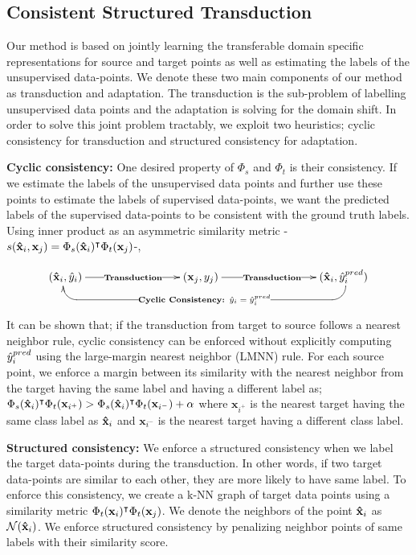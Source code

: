 \subsection{Consistent Structured Transduction}
Our method is based on jointly learning the transferable domain specific representations for source and target points as well as estimating the labels of the unsupervised data-points. We denote these two main components of our method as transduction and adaptation. The transduction is the sub-problem of labelling unsupervised data points and the adaptation is solving for the domain shift. In order to solve this joint problem tractably, we exploit two heuristics; cyclic consistency for transduction and structured consistency for adaptation. 

\textbf{Cyclic consistency:} One desired property of  $\Phi_s$ and $\Phi_t$ is their consistency. If we estimate the labels of the unsupervised data points and further use these points to estimate the labels of supervised data-points, we want the predicted labels of the supervised data-points to be consistent with the ground truth labels. Using inner product as an asymmetric similarity metric -$s(\mathbf{\hat{x}}_i, \mathbf{x}_j) = \Phi_s(\mathbf{\hat{x}}_i)^\intercal \Phi_t(\mathbf{x}_j)$-,

\begin{displaymath}
    \xymatrix{
        (\xsi,\ysi) \ar@{<-}@<-2pt>`d[r] `[rrrrrr]|{\textbf{Cyclic Consistency: $\ysi = \ysi^{pred}$}} [rrrrrr]  \ar[rrr]|{\textbf{Transduction}}     &&& (\xuj, \yuj) \ar[rrr]|{\textbf{Transduction}} &&&  (\xsi,\ysi^{pred}) }
\end{displaymath}

It can be shown that; if the transduction from target to source follows a nearest neighbor rule, cyclic consistency can be enforced without explicitly computing $\hat{y}_i^{pred}$ using the large-margin nearest neighbor (LMNN)\cite{lmnn} rule. For each source point, we enforce a margin between its similarity with the nearest neighbor from the target having the same label and having a different label as; $ \Phi_s(\mathbf{\hat{x}}_i)^\intercal \Phi_t(\mathbf{x}_{i^+}) > \Phi_s(\mathbf{\hat{x}}_i)^\intercal \Phi_t(\mathbf{x}_{i^-}) + \alpha$ where $\mathbf{x}_{i^+}$ is the nearest target having the same class label as $\mathbf{\hat{x}}_i$ and $\mathbf{x}_{i^-}$ is the nearest target having a different class label. 


\textbf{Structured consistency:} We enforce a structured consistency when we label the target data-points during the transduction. In other words, if two target data-points are similar to each other, they are more likely to have same label. To enforce this consistency, we create a k-NN graph of target data points using a similarity metric $\Phi_t(\mathbf{x}_i)^\intercal \Phi_t(\mathbf{x}_j)$. We denote the neighbors of the point $\mathbf{\hat{x}}_i$ as $\mathcal{N}(\mathbf{\hat{x}}_i)$. We enforce structured consistency by penalizing neighbor points of same labels with their similarity score. 

